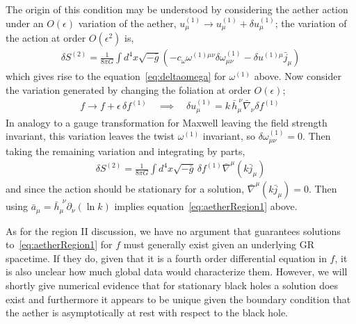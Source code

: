 \documentclass[12pt]{article}
\numberwithin{equation}{section}
\begin{document}
The origin of this condition may be understood by considering the aether action under an $O(\epsilon)$ variation of  the aether, ${u}^{(1)}_\mu \to {u}^{(1)}_\mu + \delta{u}^{(1)}_\mu$; the variation of the action at order $O(\epsilon^2)$ is,
\begin{eqnarray}
\delta S^{(2)} = \frac{1}{8\pi G} \int d^4x \sqrt{-\bar{g}} \left( - c_\omega {\omega}^{(1)\mu\nu} \delta{\omega}^{(1)}_{\mu\nu} - \delta{u}^{(1)\mu} \bar{j}_\mu \right)
\end{eqnarray}
which gives rise to the equation~\eqref{eq:deltaomega} for ${\omega}^{(1)}$ above. Now consider the variation generated by changing the foliation at order $O(\epsilon)$;
\begin{eqnarray}
f \to f + \epsilon \, \delta f^{(1)} \quad \implies \quad \delta u^{(1)}_\mu = k \, \bar{h}_\mu^{~\nu} \bar{\nabla}_\nu \delta f^{(1)} \,
\end{eqnarray}
In analogy to a gauge transformation for Maxwell leaving the field strength invariant, this variation leaves the twist $\omega^{(1)}$ invariant, so $\delta{\omega}^{(1)}_{\mu\nu} = 0$. Then taking the remaining variation and integrating by parts,
\begin{eqnarray}
\delta S^{(2)} =  \frac{1}{8\pi G} \int d^4x \sqrt{-\bar{g}} \, \delta f^{(1)} \bar{\nabla}^\mu \left( k \bar{j}_\mu \right) 
\end{eqnarray}
and since the action should be stationary for a solution, $\bar{\nabla}^\mu \left( k \bar{j}_\mu \right)  = 0$. Then using $\bar{a}_\mu = \bar{h}_\mu^{~~\nu} \partial_\nu(\ln{k})$ implies equation~\eqref{eq:aetherRegion1} above.

As for the region II discussion, we have no argument that guarantees solutions to~\eqref{eq:aetherRegion1} for $f$ must generally exist given an underlying GR spacetime. If they do, given that it is a fourth order differential equation in $f$, it is also unclear how much global data would characterize them.
%
However, we will shortly give numerical evidence that for stationary black holes a solution does exist and furthermore it appears to be unique given the boundary condition that the aether is asymptotically at rest with respect to the black hole.
\end{document}
